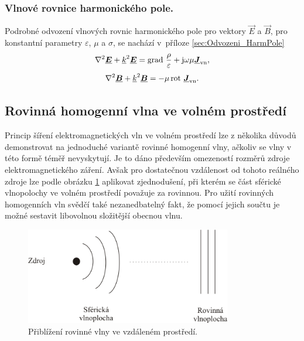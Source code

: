 \subsubsection*{Vlnové rovnice harmonického pole.}
 Podrobné odvození vlnových rovnic harmonického pole pro vektory $\vec E$ a $\vec B$, pro konstantní parametry $\varepsilon$, $\mu$ a $\sigma$, se nachází v~příloze \ref{sec:Odvozeni_HarmPole}
\begin{equation}
	\nabla^{2}\mbox{\underline{\boldmath$E$}} +{\underline{k}}^{2}\mbox{\underline{\boldmath$E$}} = \mathrm{grad}\ \frac{\rho}{\varepsilon}+ \mathrm{j}\omega\mu\mbox{\underline{\boldmath$J$}}_{\mathrm{vn}},
	\label{rce:evlny_VlnR_ElPole_harm} 
\end{equation}
\begin{equation}
	\nabla^{2}\mbox{\underline{\boldmath$B$}} +{\underline{k}}^{2}\mbox{\underline{\boldmath$B$}} = -\mu\,\mathrm{rot}\ \mbox{\underline{\boldmath$J$}}_{\mathrm{vn}}.
	\label{rce:evlny_VlnR_MagPole_harm} 
\end{equation}

\subsection{Rovinná homogenní vlna ve volném prostředí}
Princip šíření elektromagnetických vln ve volném prostředí lze z několika důvodů demonstrovat na jednoduché variantě rovinné homogenní vlny, ačkoliv se vlny v této formě téměř nevyskytují. Je to dáno především omezeností rozměrů zdroje elektromagnetického záření. Avšak pro dostatečnou vzdálenost od tohoto reálného zdroje lze podle obrázku \ref{obr:evlny_rovinna_vlna} aplikovat zjednodušení, při kterém se část sférické vlnopolochy ve volném prostředí považuje za rovinnou. Pro užití rovinných homogenních vln svědčí také nezanedbatelný fakt, že pomocí jejich součtu je možné sestavit libovolnou složitější obecnou vlnu. 

\begin{figure}[!h]
	\centering
	\includegraphics[width=9cm]{evlny_rovinna_vlna.png}
	\caption{Přiblížení rovinné vlny ve vzdáleném prostředí.}
	\label{obr:evlny_rovinna_vlna}
\end{figure}

